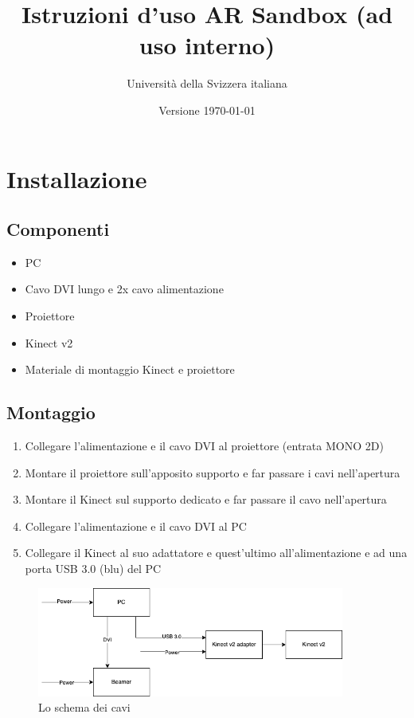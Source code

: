 \documentclass[12pt]{article}
\title{Istruzioni d'uso AR Sandbox (ad uso interno)}
\author{Università della Svizzera italiana}
\date{Versione \today}
\begin{document}
\maketitle
\tableofcontents
\newpage


\section{Installazione}\label{installation}	

	\subsection{Componenti}
	
		\begin{itemize}
			\item PC
			\item Cavo DVI lungo e 2x cavo alimentazione
			\item Proiettore
			\item Kinect v2
			\item Materiale di montaggio Kinect e proiettore
		\end{itemize}
		
		
	\subsection{Montaggio}
	
		\begin{enumerate}
			\item Collegare l'alimentazione e il cavo DVI al proiettore (entrata MONO 2D)
			\item Montare il proiettore sull'apposito supporto e far passare i cavi
			nell'apertura
			\item Montare il Kinect sul supporto dedicato e far passare il cavo nell'apertura
			\item Collegare l'alimentazione e il cavo DVI al PC
			\item Collegare il Kinect al suo adattatore e quest'ultimo all'alimentazione e ad una porta USB 3.0 (blu) del PC
		\end{enumerate}

		\begin{figure}[H]
			\centering
			\includegraphics[width=0.9\textwidth]{img/cablesScheme.png}
			\caption*{Lo schema dei cavi}
		\end{figure}
\end{document}
